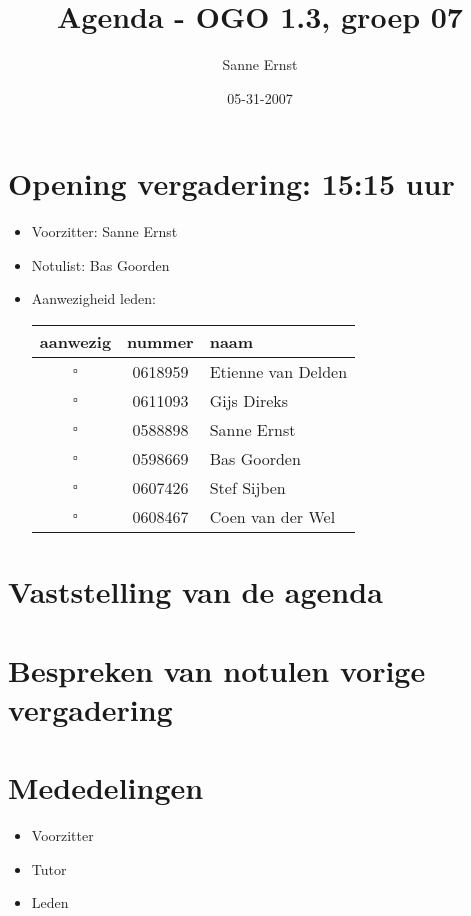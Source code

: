 \documentclass[]{article}
\title{Agenda - OGO 1.3, groep 07 }
\author{Sanne Ernst}
\date{05-31-2007}
\begin{document}
\maketitle


\section{Opening vergadering: 15:15 uur }
  \begin{itemize}
    \item Voorzitter: Sanne Ernst
    \item Notulist: Bas Goorden
    \item Aanwezigheid leden:

    \begin{tabular}{c | c | l}
      aanwezig & nummer & naam \\
      \hline
      $\square$ & 0618959 & Etienne van Delden \\
      $\square$ & 0611093 & Gijs Direks \\
      $\square$ & 0588898 & Sanne Ernst \\
      $\square$ & 0598669 & Bas Goorden \\
      $\square$ & 0607426 & Stef Sijben\\
      $\square$ & 0608467 & Coen van der Wel \\

    \end{tabular}

  \end{itemize}

\section{Vaststelling van de agenda}

\section{Bespreken van notulen vorige vergadering}


 \section{Mededelingen}
 \begin{itemize}
   \item Voorzitter
   \item Tutor
   \item Leden
 \end{itemize}
\end{document}
